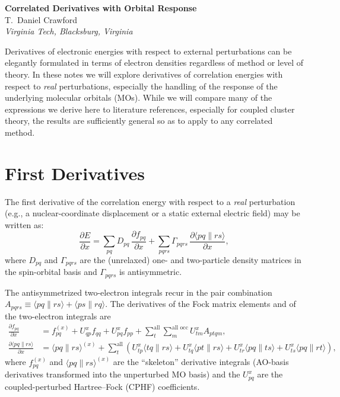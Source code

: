\documentclass[12pt]{article}
\newcommand{\adb}[2]{\langle #1 \| #2 \rangle}
\newcommand{\so}{\text{all}}
\newcommand{\alloc}{\text{all occ}}   %
\begin{document}
\begin{center}
{\bf \large Correlated Derivatives with Orbital Response} \\[2pt]
T.~Daniel Crawford \\
{\em Virginia Tech, Blacksburg, Virginia} \\
\end{center}

Derivatives of electronic energies with respect to external perturbations can
be elegantly formulated in terms of electron densities regardless of method or
level of theory.\cite{Yamaguchi94}  In these notes we will explore derivatives
of correlation energies with respect to {\em real} perturbations, especially the
handling of the response of the underlying molecular orbitals (MOs).  While we
will compare many of the expressions we derive here to literature references,
especially for coupled cluster theory, the results are sufficiently general so
as to apply to any correlated method.

\section{First Derivatives}
\label{sec:first-derivs}

The first derivative of the correlation energy with respect to a {\em real}
perturbation (e.g., a nuclear-coordinate displacement or a static external electric
field) may be written as:\cite{Gauss91:UHF}
\begin{equation}
\frac{\partial E}{\partial x}
= \sum_{pq} D_{pq}\,\frac{\partial f_{pq}}{\partial x}
+ \sum_{pqrs} \Gamma_{pqrs}\,\frac{\partial \adb{pq}{rs}}{\partial x},
\label{eq:dE}
\end{equation}
where $D_{pq}$ and $\Gamma_{pqrs}$ are the (unrelaxed) one- and two-particle
density matrices in the spin-orbital basis and $\Gamma_{pqrs}$ is antisymmetric.

\noindent
The antisymmetrized two-electron integrals recur in the pair combination
$A_{pqrs}\equiv\adb{pq}{rs}+\adb{ps}{rq}$.  The derivatives of the Fock matrix
elements and of the two-electron integrals are
\begin{align}
\frac{\partial f_{pq}}{\partial x}
&= f^{(x)}_{pq} + U^x_{qp} f_{qq} + U^x_{pq} f_{pp}
+ \sum_{t}^{\so}\sum_{m}^{\alloc} U^x_{tm}A_{ptqm},
\label{eq:dfpq}\\[4pt]
\frac{\partial \adb{pq}{rs}}{\partial x}
&= \adb{pq}{rs}^{(x)}
+ \sum_{t}^{\so}\left(U^x_{tp}\adb{tq}{rs} + U^x_{tq}\adb{pt}{rs}
+ U^x_{tr}\adb{pq}{ts} + U^x_{ts}\adb{pq}{rt}\right),
\label{eq:deri}
\end{align}
where $f^{(x)}_{pq}$ and $\adb{pq}{rs}^{(x)}$ are the ``skeleton'' derivative
integrals (AO-basis derivatives transformed into the unperturbed MO basis) and
the $U^x_{pq}$ are the coupled-perturbed Hartree--Fock (CPHF) coefficients.
\end{document}
